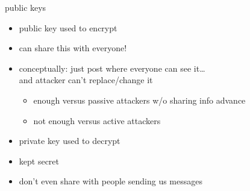 \begin{frame}{public keys}
    \begin{itemize}
    \item public key used to encrypt
    \item can share this with everyone!
    \item conceptually: just post where everyone can see it\ldots \\
        and attacker can't replace/change it
        \begin{itemize}
        \item enough versus passive attackers w/o sharing info advance
        \item not enough versus active attackers
        \end{itemize}
    \vspace{.5cm}
    \item private key used to decrypt
    \item kept secret
    \item don't even share with people sending us messages
    \end{itemize}
\end{frame}

